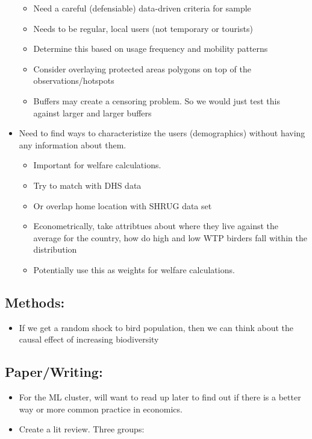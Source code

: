 \documentclass[
  letterpaper,
]{article}
\providecommand{\tightlist}{%
  \setlength{\itemsep}{0pt}\setlength{\parskip}{0pt}}\usepackage{longtable,booktabs,array}
\begin{document}
\begin{tcolorbox}
\begin{itemize}
  \begin{itemize}
  \tightlist
  \item
    Need a careful (defensiable) data-driven criteria for sample
  \item
    Needs to be regular, local users (not temporary or tourists)
  \item
    Determine this based on usage frequency and mobility patterns
  \item
    Consider overlaying protected areas polygons on top of the
    observations/hotspots
  \item
    Buffers may create a censoring problem. So we would just test this
    against larger and larger buffers
  \end{itemize}
\item
  Need to find ways to characteristize the users (demographics) without
  having any information about them.

  \begin{itemize}
  \tightlist
  \item
    Important for welfare calculations.
  \item
    Try to match with DHS data
  \item
    Or overlap home location with SHRUG data set
  \item
    Econometrically, take attribtues about where they live against the
    average for the country, how do high and low WTP birders fall within
    the distribution
  \item
    Potentially use this as weights for welfare calculations.
  \end{itemize}
\end{itemize}

\subsection{Methods:}\label{methods}

\begin{itemize}
\tightlist
\item
  If we get a random shock to bird population, then we can think about
  the causal effect of increasing biodiversity
\end{itemize}

\subsection{Paper/Writing:}\label{paperwriting}

\begin{itemize}
\tightlist
\item
  For the ML cluster, will want to read up later to find out if there is
  a better way or more common practice in economics.
\item
  Create a lit review. Three groups:


\end{itemize}
\end{tcolorbox}
\end{document}
